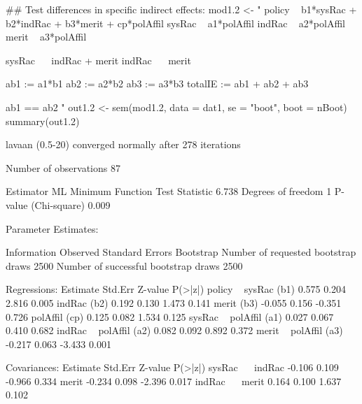 \begin{Schunk}
\begin{Sinput}
 ## Test differences in specific indirect effects:
 mod1.2 <- "
 policy ~ b1*sysRac + b2*indRac + b3*merit + cp*polAffil
 sysRac ~ a1*polAffil
 indRac ~ a2*polAffil
 merit ~ a3*polAffil
 
 sysRac ~~ indRac + merit
 indRac ~~ merit
 
 ab1 := a1*b1
 ab2 := a2*b2
 ab3 := a3*b3
 totalIE := ab1 + ab2 + ab3
 
 ab1 == ab2
 "
 out1.2 <- 
     sem(mod1.2, data = dat1, se = "boot", boot = nBoot)
 summary(out1.2)
\end{Sinput}
\begin{Soutput}
lavaan (0.5-20) converged normally after 278 iterations

  Number of observations                            87

  Estimator                                         ML
  Minimum Function Test Statistic                6.738
  Degrees of freedom                                 1
  P-value (Chi-square)                           0.009

Parameter Estimates:

  Information                                 Observed
  Standard Errors                            Bootstrap
  Number of requested bootstrap draws             2500
  Number of successful bootstrap draws            2500

Regressions:
                   Estimate  Std.Err  Z-value  P(>|z|)
  policy ~                                            
    sysRac    (b1)    0.575    0.204    2.816    0.005
    indRac    (b2)    0.192    0.130    1.473    0.141
    merit     (b3)   -0.055    0.156   -0.351    0.726
    polAffil  (cp)    0.125    0.082    1.534    0.125
  sysRac ~                                            
    polAffil  (a1)    0.027    0.067    0.410    0.682
  indRac ~                                            
    polAffil  (a2)    0.082    0.092    0.892    0.372
  merit ~                                             
    polAffil  (a3)   -0.217    0.063   -3.433    0.001

Covariances:
                   Estimate  Std.Err  Z-value  P(>|z|)
  sysRac ~~                                           
    indRac           -0.106    0.109   -0.966    0.334
    merit            -0.234    0.098   -2.396    0.017
  indRac ~~                                           
    merit             0.164    0.100    1.637    0.102


\end{Soutput}
\end{Schunk}
